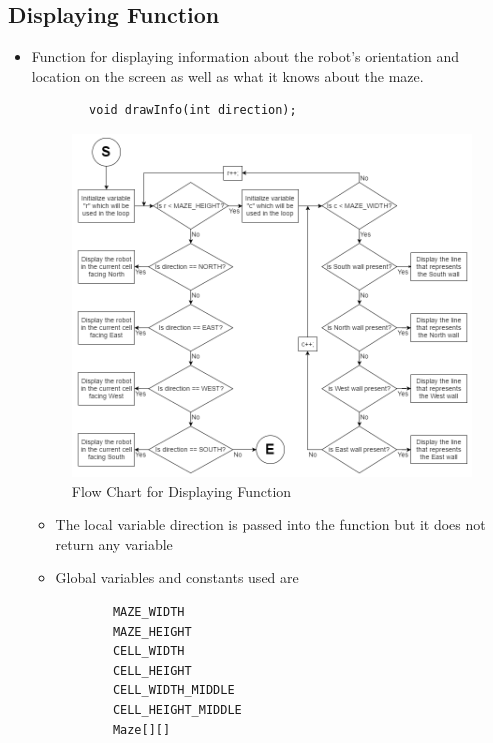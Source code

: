 \documentclass[11pt]{article}
\begin{document}
\subsection{Displaying Function}
\begin{itemize}
\item Function for displaying information about the robot's orientation and location on the screen as well as what it knows about the maze. 
	\begin{verbatim}
		void drawInfo(int direction);
	\end{verbatim}
\begin{figure}[htp]
\centering
\includegraphics[scale=0.57]{images/Software_Flowchart/Drawing_Function.png}
\caption{Flow Chart for Displaying Function}
\label{}
\end{figure}
	\begin{itemize}
	\item The local variable direction is passed into the function but it does not return any variable
	\item Global variables and constants used are
	\begin{verbatim}
		MAZE_WIDTH
		MAZE_HEIGHT
		CELL_WIDTH
		CELL_HEIGHT
		CELL_WIDTH_MIDDLE
		CELL_HEIGHT_MIDDLE
		Maze[][]
	\end{verbatim}
	\end{itemize}
\end{itemize}
\newpage

\end{document}
